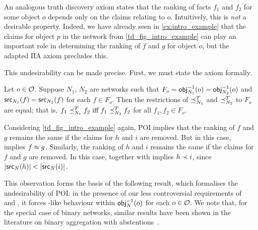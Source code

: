 

An analogous truth discovery axiom states that the ranking of facts $f_1$ and
$f_2$ for some object $o$ depends only on the claims relating to $o$.
Intuitively, this is \emph{not} a desirable property. Indeed, we have already
seen in \cref{ex:intro_example} that the claims for object $p$ in the
network from \cref{td_fig_intro_example} can play an important role in
determining the ranking of $f$ and $g$ for object $o$, but the adapted IIA
axiom precludes this.

This undesirability can be made precise. First, we must state the axiom
formally.

\begin{axiom}

Let $o \in \mathcal{O}$. Suppose $N_1$, $N_2$ are networks such that $F_o =
\mathsf{obj}_{N_1}^{-1}(o) = \mathsf{obj}_{N_2}^{-1}(o)$ and $\mathsf{src}_{N_1}(f) = \mathsf{src}_{N_2}(f)$
for each $f \in F_o$. Then the restrictions of $\preceq_{N_1}^T$ and
$\preceq_{N_2}^T$ to $F_o$ are equal; that is, $f_1 \fle_{N_1}^T f_2\ \textrm{iff
}f_1 \fle_{N_2}^T f_2$ for all $f_1, f_2 \in F_o$.

\end{axiom}

Considering \cref{td_fig_intro_example} again, POI implies that the ranking
of $f$ and $g$ remains the same if the claims for $h$ and $i$ are removed. But
in this case, \symmetry{} implies $f \approx g$. Similarly, the ranking of $h$ and
$i$ remains the same if the claims for $f$ and $g$ are removed. In this case,
\symmetry{} together with \monotonicity{} implies $h \prec i$, since $|\mathsf{src}_N(h)| <
|\mathsf{src}_N(i)|$.

This observation forms the basis of the following result, which formalises the
undesirability of POI: in the presence of our less controversial requirements
of \symmetry{} and \monotonicity{}, it forces \voting{}-like behaviour within
$\mathsf{obj}_N^{-1}(o)$ for each $o \in \mathcal{O}$.  We note that, for the special case of
binary networks, similar results have been shown in the literature on binary
aggregation with abstentions~\cite{christoffbinary}.

